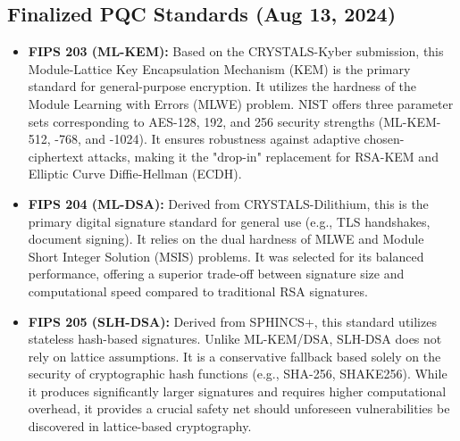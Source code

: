 \documentclass[11pt,a4paper]{article}
\begin{document}
\subsection{Finalized PQC Standards (Aug 13, 2024)}
\begin{itemize}[leftmargin=*]
  \item \textbf{FIPS 203 (ML-KEM):} Based on the CRYSTALS-Kyber submission, this Module-Lattice Key Encapsulation Mechanism (KEM) is the primary standard for general-purpose encryption. It utilizes the hardness of the Module Learning with Errors (MLWE) problem. NIST offers three parameter sets corresponding to AES-128, 192, and 256 security strengths (ML-KEM-512, -768, and -1024). It ensures robustness against adaptive chosen-ciphertext attacks, making it the "drop-in" replacement for RSA-KEM and Elliptic Curve Diffie-Hellman (ECDH).\cite{nist203}
  \item \textbf{FIPS 204 (ML-DSA):} Derived from CRYSTALS-Dilithium, this is the primary digital signature standard for general use (e.g., TLS handshakes, document signing). It relies on the dual hardness of MLWE and Module Short Integer Solution (MSIS) problems. It was selected for its balanced performance, offering a superior trade-off between signature size and computational speed compared to traditional RSA signatures.\cite{nist204}
  \item \textbf{FIPS 205 (SLH-DSA):} Derived from SPHINCS+, this standard utilizes stateless hash-based signatures. Unlike ML-KEM/DSA, SLH-DSA does not rely on lattice assumptions. It is a conservative fallback based solely on the security of cryptographic hash functions (e.g., SHA-256, SHAKE256). While it produces significantly larger signatures and requires higher computational overhead, it provides a crucial safety net should unforeseen vulnerabilities be discovered in lattice-based cryptography.\cite{nist205}
\end{itemize}
\end{document}
